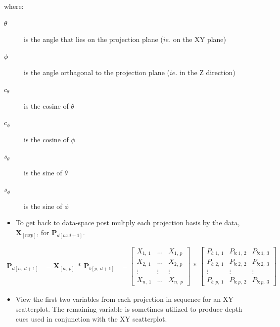 \documentclass{monashthesis}
\begin{document}
where:

\begin{description}
  \item[$\theta$] is the angle that lies on the projection plane ($ie.$ on the XY plane)
  \item[$\phi$] is the angle orthagonal to the projection plane ($ie.$ in the Z direction)
  \item[$c_\theta$] is the cosine of $\theta$
  \item[$c_\phi$]   is the cosine of $\phi$
  \item[$s_\theta$] is the sine of   $\theta$
  \item[$s_\phi$]   is the sine of   $\phi$
\end{description}

\begin{itemize}
\tightlist
\item
  To get back to data-space post multply each projection basis by the
  data, \(\textbf{X}_{[n x p]}\), for \(\textbf{P}_{d[n x d+1]}\).
\end{itemize}

\begin{align}
  \textbf{P}_{d[n,~d+1]}
    &= \textbf{X}_{[n,~p]} ~*~ \textbf{P}_{b[p,~d+1]}
    &= \begin{bmatrix}
      X_{1,~1} & \dots & X_{1,~p} \\
      X_{2,~1} & \dots & X_{2,~p} \\
      \vdots   & \vdots & \vdots  \\
      X_{n,~1} & \dots & X_{n,~p}
    \end{bmatrix}
      ~*~
    \begin{bmatrix}
      P_{b:1,~1} & P_{b:1,~2} & P_{b:1,~3} \\
      P_{b:2,~1} & P_{b:2,~2} & P_{b:2,~3} \\
      \vdots     & \vdots     & \vdots     \\
      P_{b:p,~1} & P_{b:p,~2} & P_{b:p,~3}
    \end{bmatrix}
\end{align}

\begin{itemize}
\tightlist
\item
  View the first two variables from each projection in sequence for an
  XY scatterplot. The remaining variable is sometimes utilized to
  produce depth cues used in conjunction with the XY scatterplot.
\end{itemize}
\end{document}
